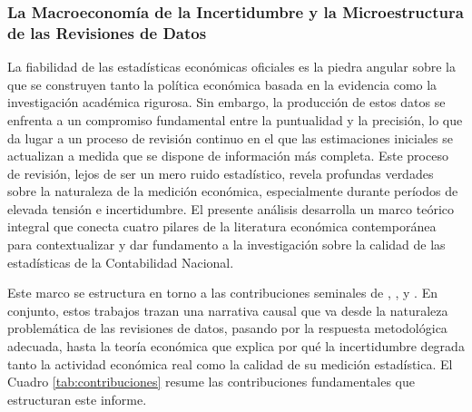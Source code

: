 \documentclass{article}
\begin{document}
\subsubsection{La Macroeconomía de la Incertidumbre y la Microestructura de las Revisiones de Datos}

La fiabilidad de las estadísticas económicas oficiales es la piedra angular sobre la que se construyen tanto la política económica basada en la evidencia como la investigación académica rigurosa. Sin embargo, la producción de estos datos se enfrenta a un compromiso fundamental entre la puntualidad y la precisión, lo que da lugar a un proceso de revisión continuo en el que las estimaciones iniciales se actualizan a medida que se dispone de información más completa. Este proceso de revisión, lejos de ser un mero ruido estadístico, revela profundas verdades sobre la naturaleza de la medición económica, especialmente durante períodos de elevada tensión e incertidumbre. El presente análisis desarrolla un marco teórico integral que conecta cuatro pilares de la literatura económica contemporánea para contextualizar y dar fundamento a la investigación sobre la calidad de las estadísticas de la Contabilidad Nacional.

Este marco se estructura en torno a las contribuciones seminales de \citet{aruoba2008}, \citet{croushore2011}, \citet{bloom2009} y \citet{baker2016}. En conjunto, estos trabajos trazan una narrativa causal que va desde la naturaleza problemática de las revisiones de datos, pasando por la respuesta metodológica adecuada, hasta la teoría económica que explica por qué la incertidumbre degrada tanto la actividad económica real como la calidad de su medición estadística. El Cuadro \ref{tab:contribuciones} resume las contribuciones fundamentales que estructuran este informe.
\end{document}
